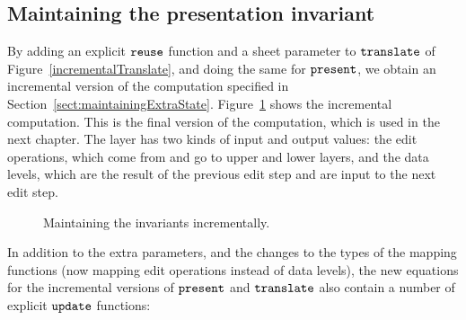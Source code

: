 %																
\subsection{Maintaining the presentation invariant}

By adding an explicit ${\tt reuse}$ function and a sheet parameter to ${\tt translate}$ of Figure~\ref{incrementalTranslate}, and doing the same for ${\tt present}$, we obtain an incremental version of the computation specified in Section~\ref{sect:maintainingExtraState}. Figure~\ref{layerExtraStateInc} shows the incremental computation. This is the final version of the computation, which is used in the next chapter. The layer has two kinds of input and output values: the edit operations, which come from and go to upper and lower layers, and the data levels, which are the result of the previous edit step and are input to the next edit step.

\begin{figure}
\begin{center}
\begin{center}
\end{center}
\caption{Maintaining the invariants incrementally.}\label{layerExtraStateInc} 
\end{center}
\end{figure}

In addition to the extra parameters, and the changes to the types of the mapping functions (now mapping edit operations instead of data levels),  the new equations for the incremental versions of ${\tt present}$ and 
${\tt translate}$ also contain a number of explicit  ${\tt update}$ functions: 

